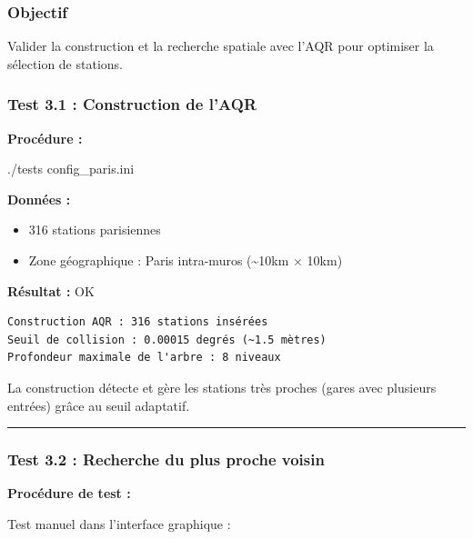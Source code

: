 \documentclass[
]{article}
\newcommand{\OK}{OK~\twemoji{white_check_mark}}
\newcommand{\OK}{OK~\twemoji{white_check_mark}}
\newenvironment{Shaded}{}{}
\newcommand{\ExtensionTok}[1]{#1}
\newcommand{\NormalTok}[1]{#1}
\providecommand{\tightlist}{%
  \setlength{\itemsep}{0pt}\setlength{\parskip}{0pt}}
\begin{document}
\subsubsection{Objectif}\label{objectif-2}

Valider la construction et la recherche spatiale avec l'AQR pour
optimiser la sélection de stations.

\subsubsection{Test 3.1 : Construction de
l'AQR}\label{test-3.1-construction-de-laqr}

\textbf{Procédure :}

\begin{Shaded}
\begin{Highlighting}[]
\ExtensionTok{./tests}\NormalTok{ config\_paris.ini}
\end{Highlighting}
\end{Shaded}

\textbf{Données :}

\begin{itemize}
\tightlist
\item
  316 stations parisiennes
\item
  Zone géographique : Paris intra-muros (\textasciitilde10km × 10km)
\end{itemize}

\textbf{Résultat :} \OK

\begin{verbatim}
Construction AQR : 316 stations insérées
Seuil de collision : 0.00015 degrés (~1.5 mètres)
Profondeur maximale de l'arbre : 8 niveaux
\end{verbatim}

La construction détecte et gère les stations très proches (gares avec
plusieurs entrées) grâce au seuil adaptatif.

\begin{center}\rule{0.5\linewidth}{0.5pt}\end{center}

\subsubsection{Test 3.2 : Recherche du plus proche
voisin}\label{test-3.2-recherche-du-plus-proche-voisin}

\textbf{Procédure de test :}

Test manuel dans l'interface graphique :
\end{document}
